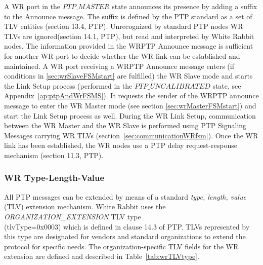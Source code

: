 \documentclass[a4paper, 12pt]{article}
\begin{document}
A WR port in the $PTP\_MASTER$ state announces its presence by adding a suffix to the Announce 
message. The suffix is defined by the PTP standard as a set of TLV entities (section 13.4, PTP). 
Unrecognized by standard PTP nodes WR TLVs are ignored(section 14.1, PTP), 
but read and interpreted by White Rabbit nodes. 
The information provided in the WRPTP Announce message is sufficient for another WR port to decide 
whether the WR link can be established and maintained. A WR port receiving a 
WRPTP Announce message enters (if conditions in \ref{sec:wrSlaveFSMstart} are fulfilled) 
the WR Slave mode and starts the Link Setup process (performed in the $PTP\_UNCALIBRATED$ state, 
see Appendix~\ref{ap:ptpAndWrFSMS}). It requests the sender of the WRPTP announce message 
to enter the WR Master mode (see section \ref{sec:wrMasterFSMstart}) and start 
the Link Setup process as well. During the WR Link Setup, communication between the WR Master and 
the WR Slave is performed using PTP Signaling Messages carrying WR TLVs 
(section~\ref{sec:communicationWRfsm}). Once the WR link has been established, the WR nodes use 
a PTP delay request-response mechanism (section 11.3, PTP).


\subsubsection{WR Type-Length-Value}
\label{sec:wrTLVtype}

All PTP messages can be extended by means of a standard \textit{type, length, value} (TLV) 
extension mechanism. White Rabbit uses the \textit{ORGANIZATION\_EXTENSION} TLV type \\
(tlvType=0x0003) which is defined in clause 14.3 of PTP. TLVs represented by this type 
are designated for vendors and standard organizations to extend the protocol for specific needs. 
The organization-specific TLV fields for the WR extension are defined and described in 
Table~\ref{tab:wrTLVtype}. 
\end{document}
